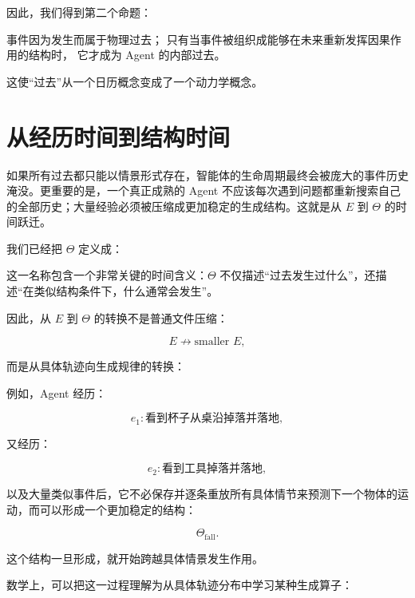 因此，我们得到第二个命题：

\begin{proposition*}
事件因为发生而属于物理过去；
只有当事件被组织成能够在未来重新发挥因果作用的结构时，
它才成为 Agent 的内部过去。
\end{proposition*}

这使“过去”从一个日历概念变成了一个动力学概念。

\section{从经历时间到结构时间}

如果所有过去都只能以情景形式存在，智能体的生命周期最终会被庞大的事件历史淹没。更重要的是，一个真正成熟的 Agent 不应该每次遇到问题都重新搜索自己的全部历史；大量经验必须被压缩成更加稳定的生成结构。这就是从 $E$ 到 $\Theta$ 的时间跃迁。

我们已经把 $\Theta$ 定义成：

\begin{statementbox}
\centering
{}
\end{statementbox}

这一名称包含一个非常关键的时间含义：$\Theta$ 不仅描述“过去发生过什么”，还描述“在类似结构条件下，什么通常会发生”。

因此，从 $E$ 到 $\Theta$ 的转换不是普通文件压缩：

\[
E
\not\rightarrow
\text{smaller }E,
\]

而是从具体轨迹向生成规律的转换：

\begin{statementbox}
\centering
{}
\end{statementbox}

例如，Agent 经历：

\[
e_1:
\text{看到杯子从桌沿掉落并落地},
\]

又经历：

\[
e_2:
\text{看到工具掉落并落地},
\]

以及大量类似事件后，它不必保存并逐条重放所有具体情节来预测下一个物体的运动，而可以形成一个更加稳定的结构：

\[
\Theta_{\mathrm{fall}}.
\]

这个结构一旦形成，就开始跨越具体情景发生作用。

数学上，可以把这一过程理解为从具体轨迹分布中学习某种生成算子：

